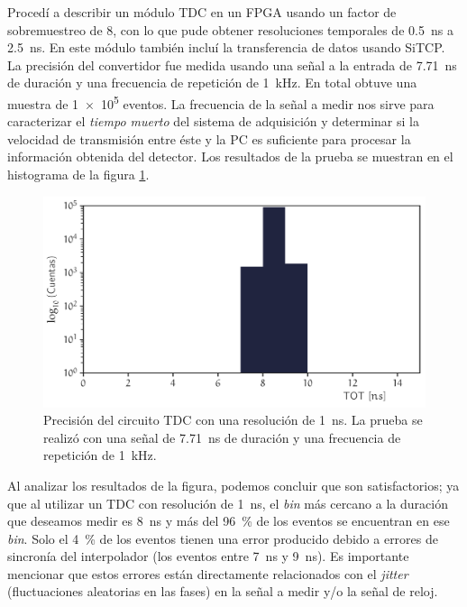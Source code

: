 Procedí a describir un módulo TDC en un FPGA usando un factor de sobremuestreo de \num{8}, con lo que pude obtener resoluciones temporales de \SI{0.5}{\nano\second} a \SI{2.5}{\nano\second}. En este módulo también incluí la transferencia de datos usando SiTCP. La precisión del convertidor fue medida usando una señal a la entrada de \SI{7.71}{\nano\second} de duración y una frecuencia de repetición de \SI{1}{\kilo\hertz}. En total obtuve una muestra de \num{1e5} eventos. La frecuencia de la señal a medir nos sirve para caracterizar el \emph{tiempo muerto} del sistema de adquisición y determinar si la velocidad de transmisión entre éste y la PC es suficiente para procesar la información obtenida del detector. Los resultados de la prueba se muestran en el histograma de la figura \ref{fig:tdc-lvds}.

\begin{figure}
        \centering
        \includegraphics[width=\textwidth]{tot-lvds.pdf}
        \caption{Precisión del circuito TDC con una resolución de \SI{1}{\nano\second}. La prueba se realizó con una señal de \SI{7.71}{\nano\second} de duración y una frecuencia de repetición de \SI{1}{\kilo\hertz}.}
        \label{fig:tdc-lvds}
\end{figure}

Al analizar los resultados de la figura, podemos concluir que son satisfactorios; ya que al utilizar un TDC con resolución de \SI{1}{\nano\second}, el \emph{bin} más cercano a la duración que deseamos medir es \SI{8}{\nano\second} y más del \SI{96}{\percent} de los eventos se encuentran en ese \emph{bin}. Solo el \SI{4}{\percent} de los eventos tienen una error producido debido a errores de sincronía del interpolador (los eventos entre \SI{7}{\nano\second} y \SI{9}{\nano\second}). Es importante mencionar que estos errores están directamente relacionados con el \emph{jitter} (fluctuaciones aleatorias en las fases) en la señal a medir y/o la señal de reloj.

